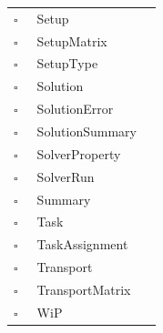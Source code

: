 \begin{longtable}{llp{8cm}}
$\square$\ & Setup &  \\
$\square$\ & SetupMatrix &  \\
$\square$\ & SetupType &  \\
$\square$\ & Solution &  \\
$\square$\ & SolutionError &  \\
$\square$\ & SolutionSummary &  \\
$\square$\ & SolverProperty &  \\
$\square$\ & SolverRun &  \\
$\square$\ & Summary &  \\
$\square$\ & Task &  \\
$\square$\ & TaskAssignment &  \\
$\square$\ & Transport &  \\
$\square$\ & TransportMatrix &  \\
$\square$\ & WiP &  \\
\end{longtable}
